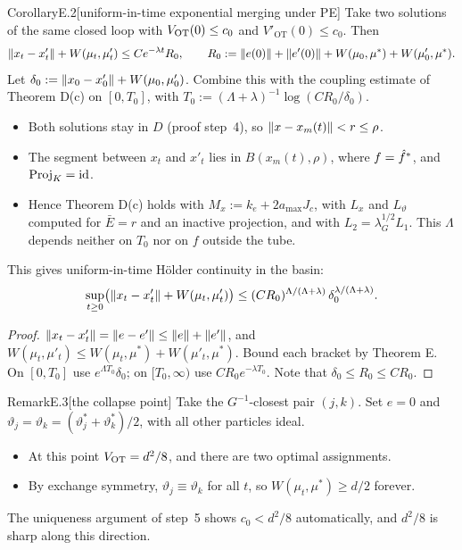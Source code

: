 \begin{thm}{Corollary}{E.2}[uniform-in-time exponential merging under PE]
Take two solutions of the same closed loop with $V_{\mathrm{OT}}(0)\le c_0$ and $V'_{\mathrm{OT}}(0)\le c_0$. Then
\begin{equation}\label{eq:thmE:merging}
  \lVert x_t-x'_t\rVert+W(\mu_t,\mu'_t)\le Ce^{-\lambda t}R_0,\qquad
  R_0:=\lVert e(0)\rVert+\lVert e'(0)\rVert+W(\mu_0,\mu^*)+W(\mu'_0,\mu^*).
\end{equation}
Let $\delta_0:=\lVert x_0-x'_0\rVert+W(\mu_0,\mu'_0)$. Combine this with the coupling estimate of Theorem D(c) on
$[0,T_0]$, with $T_0:=(\Lambda+\lambda)^{-1}\log(CR_0/\delta_0)$.
\begin{itemize}
  \item Both solutions stay in $D$ (proof step~4), so $\lVert x-x_m(t)\rVert<r\le\rho$.
  \item The segment between $x_t$ and $x'_t$ lies in $B(x_m(t),\rho)$, where $f=\hat f^*$, and $\operatorname{Proj}_K=\mathrm{id}$.
  \item Hence Theorem D(c) holds with $M_x:=k_e+2a_{\max}J_c$, with $L_x$ and $L_\vartheta$ computed for $\bar E=r$
    and an inactive projection, and with $L_2=\lambda_G^{1/2}L_1$. This $\Lambda$ depends neither on $T_0$ nor on $f$
    outside the tube.
\end{itemize}
This gives uniform-in-time Hölder continuity in the basin:
\begin{equation}\label{eq:thmE:holder}
  \sup_{t\ge0}\bigl(\lVert x_t-x'_t\rVert+W(\mu_t,\mu'_t)\bigr)\le(CR_0)^{\Lambda/(\Lambda+\lambda)}\,
  \delta_0^{\lambda/(\Lambda+\lambda)}.
\end{equation}
\end{thm}

\begin{proof}
$\lVert x_t-x'_t\rVert=\lVert e-e'\rVert\le\lVert e\rVert+\lVert e'\rVert$, and $W(\mu_t,\mu'_t)\le W(\mu_t,\mu^*)+W(\mu'_t,\mu^*)$. Bound
each bracket by Theorem E. On $[0,T_0]$ use $e^{\Lambda T_0}\delta_0$; on $[T_0,\infty)$ use $CR_0e^{-\lambda T_0}$.
Note that $\delta_0\le R_0\le CR_0$.
\end{proof}

\begin{rmk}{Remark}{E.3}[the collapse point]
Take the $G^{-1}$-closest pair $(j,k)$. Set $e=0$ and $\vartheta_j=\vartheta_k=(\vartheta^*_j+\vartheta^*_k)/2$,
with all other particles ideal.
\begin{itemize}
  \item At this point $V_{\mathrm{OT}}=d^2/8$, and there are two optimal assignments.
  \item By exchange symmetry, $\vartheta_j\equiv\vartheta_k$ for all $t$, so $W(\mu_t,\mu^*)\ge d/2$ forever.
\end{itemize}
The uniqueness argument of step~5 shows $c_0<d^2/8$ automatically, and $d^2/8$ is sharp along this direction.
\end{rmk}
